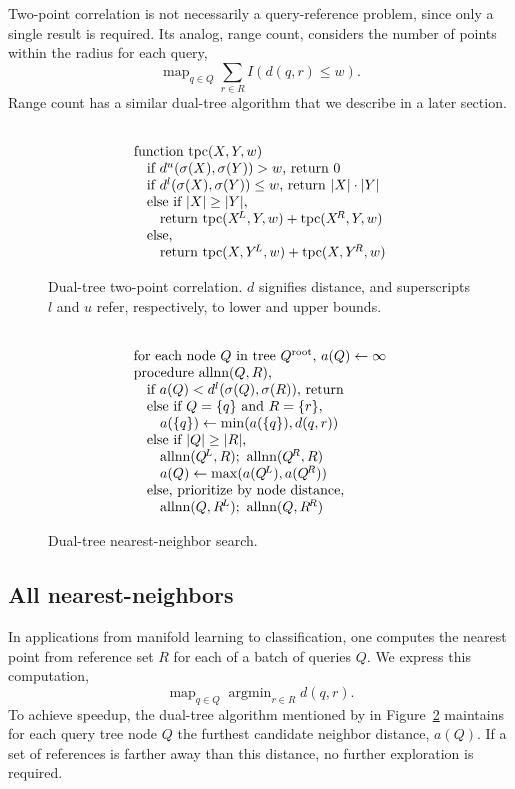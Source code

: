 \documentclass[twoside,leqno,twocolumn]{article}
\DeclareMathOperator*{\map}{map}
\DeclareMathOperator*{\argmin}{argmin}
\newcommand{\fig}[1]{Figure~\ref{fig:#1}}
\newcommand{\psty}{}
\newcommand{\X}{\\ \psty}
\newcommand{\x}{\X \hspace{0.13in}}
\newcommand{\xx}{\X \hspace{0.26in}}
\newcommand{\mysub}[1]{\subsection{#1} }
\newcommand{\kdroot}[1]{#1^{\text{root}}}
\newcommand{\kdleft}[1]{#1^{\!L}}
\newcommand{\kdright}[1]{#1^{\!R}}
\newcommand{\lo}[1]{#1^{l}}
\newcommand{\up}[1]{#1^{u}}
\newcommand{\distlo}{\lo{d}}
\newcommand{\distup}{\up{d}}
\newcommand{\dist}[2]{d(#1,#2)}
\newcommand{\outstat}{\sigma}
\begin{document}
Two-point correlation is not necessarily a query-reference problem, since only a single result is required.
Its analog, range count, considers the number of points within the radius for each query,
\[\map_{q \in Q} \sum_{r \in R} I(d(q, r) \leq w).\]
Range count has a similar dual-tree algorithm that we describe in a later section.

\begin{figure}[t]
  \begin{displaymath}
    \begin{array}[t]{l}
      \X \text{function tpc}(X, Y, w)
      \x \text{if }\distup(\outstat(X), \outstat(Y)) > w\text{, return }0
      \x \text{if }\distlo(\outstat(X), \outstat(Y)) \leq w\text{, return } |X| \cdot |Y|
      \x \text{else if }|X| \geq |Y|\text{,}
      \xx \text{return tpc}(\kdleft{X}, Y, w) + \text{tpc}(\kdright{X}, Y, w)
      \x \text{else,}
      \xx \text{return tpc}(X, \kdleft{Y}, w) + \text{tpc}(X, \kdright{Y}, w)
    \end{array}
  \end{displaymath}
  \caption{\label{fig:tpc} Dual-tree two-point correlation.
  $d$ signifies distance, and superscripts $l$ and $u$ refer, respectively, to lower and upper bounds.}
\end{figure}

\begin{figure}[t]
  \begin{displaymath}
   \begin{array}[t]{l}
     \X \text{for each node }Q\text{ in tree } \kdroot{Q}\text{, }a(Q) \gets \infty
     \X \text{procedure allnn}(Q,R)\text{,}
     \x \text{if }a(Q) < \distlo(\outstat(Q), \outstat(R))\text{, return}
     \x \text{else if }Q = \{q\} \text{ and } R = \{r\}\text{,}
     \xx a(\{q\}) \gets \min(a(\{q\}), \dist{q}{r})
     \x \text{else if }|Q| \geq |R|\text{,}
     \xx \text{allnn}(\kdleft{Q}, R); \text{ allnn}(\kdright{Q}, R)
     \xx a(Q) \gets \max(a(\kdleft{Q}), a(\kdright{Q}))
     \x \text{else, prioritize by node distance,}
     \xx \text{allnn}(Q, \kdleft{R}); \text{ allnn}(Q, \kdright{R})
   \end{array}
  \end{displaymath}
  \caption{\label{fig:allnn} Dual-tree nearest-neighbor search.}
\end{figure}

\mysub{All nearest-neighbors}
In applications from manifold learning to classification, one computes the nearest point from reference set $R$ for each of a batch of queries $Q$.
We express this computation,
\[\map_{q \in Q} \argmin_{r \in R} d(q,r).\]
\noindent To achieve speedup, the dual-tree algorithm mentioned by \cite{gray_nbody} in \fig{allnn} maintains for each query tree node $Q$ the furthest candidate neighbor distance, $a(Q)$.
If a set of references is farther away than this distance, no further exploration is required.
\end{document}
